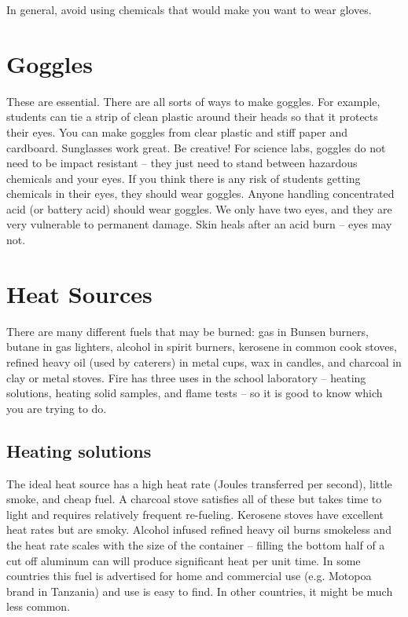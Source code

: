 In general, 
avoid using chemicals that would make you want to wear gloves.

\section{Goggles}
These are essential. 
There are all sorts of ways to make goggles. 
For example, 
students can tie a strip of clean plastic around their heads 
so that it protects their eyes. 
You can make goggles from clear plastic and stiff paper and cardboard. 
Sunglasses work great. 
Be creative! For science labs, 
goggles do not need to be impact resistant – 
they just need to stand between hazardous chemicals and your eyes. 
If you think there is any risk of students getting chemicals in their eyes, 
they should wear goggles. 
Anyone handling concentrated acid (or battery acid) should wear goggles. 
We only have two eyes, 
and they are very vulnerable to permanent damage. 
Skin heals after an acid burn – eyes may not.

\section{Heat Sources}

There are many different fuels that may be burned: gas in Bunsen burners, 
butane in gas lighters, 
alcohol in spirit burners, 
kerosene in common cook stoves, 
refined heavy oil (used by caterers) in metal cups, 
wax in candles, 
and charcoal in clay or metal stoves. 
Fire has three uses in the school laboratory – heating solutions, 
heating solid samples, 
and flame tests – so it is good to know which you are trying to do.

\subsection{Heating solutions}
The ideal heat source has a high heat rate (Joules transferred per second), 
little smoke, 
and cheap fuel. 
A charcoal stove satisfies all of these 
but takes time to light and requires relatively frequent re-fueling. 
Kerosene stoves have excellent heat rates but are smoky. 
Alcohol infused refined heavy oil burns smokeless 
and the heat rate scales with the size of the container – 
filling the bottom half of a cut off aluminum can 
will produce significant heat per unit time. 
In some countries this fuel is advertised for home and commercial use (e.g. 
Motopoa brand in Tanzania) and use is easy to find. 
In other countries, 
it might be much less common.

